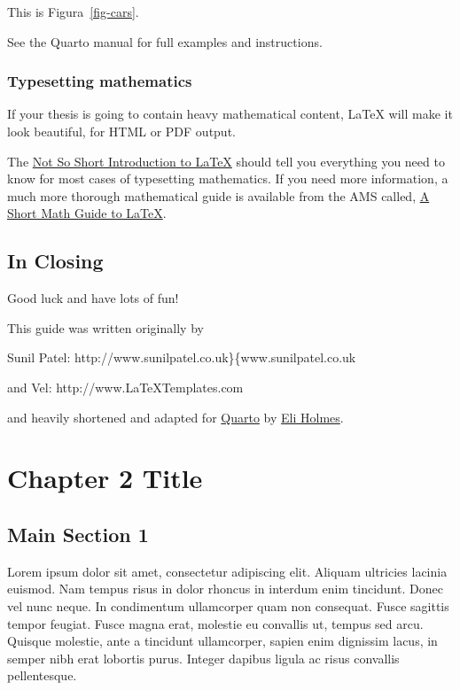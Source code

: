 \documentclass[
  letterpaper,
  11pt,
  spanish,
  singlespacing,
  headsepline]{MastersDoctoralThesis}
\begin{document}
This is Figura~\ref{fig-cars}.

See the Quarto manual for full examples and instructions.

\hypertarget{typesetting-mathematics}{%
\subsection{Typesetting mathematics}\label{typesetting-mathematics}}

If your thesis is going to contain heavy mathematical content, \LaTeX{}
will make it look beautiful, for HTML or PDF output.

The
\href{http://www.ctan.org/tex-archive/info/lshort/english/lshort.pdf}{Not
So Short Introduction to LaTeX} should tell you everything you need to
know for most cases of typesetting mathematics. If you need more
information, a much more thorough mathematical guide is available from
the AMS called,
\href{http://tug.ctan.org/info/short-math-guide/short-math-guide.pdf}{A
Short Math Guide to LaTeX}.

\hypertarget{in-closing}{%
\section{In Closing}\label{in-closing}}

Good luck and have lots of fun!

This guide was written originally by

Sunil Patel: http://www.sunilpatel.co.uk\}\{www.sunilpatel.co.uk

and Vel: http://www.LaTeXTemplates.com

and heavily shortened and adapted for \href{https://quarto.org/}{Quarto}
by \href{https://eeholmes.github.io}{Eli Holmes}.


\hypertarget{sec-Chapter2}{%
\chapter{Chapter 2 Title}\label{sec-Chapter2}}

\hypertarget{main-section-1}{%
\section{Main Section 1}\label{main-section-1}}

Lorem ipsum dolor sit amet, consectetur adipiscing elit. Aliquam
ultricies lacinia euismod. Nam tempus risus in dolor rhoncus in interdum
enim tincidunt. Donec vel nunc neque. In condimentum ullamcorper quam
non consequat. Fusce sagittis tempor feugiat. Fusce magna erat, molestie
eu convallis ut, tempus sed arcu. Quisque molestie, ante a tincidunt
ullamcorper, sapien enim dignissim lacus, in semper nibh erat lobortis
purus. Integer dapibus ligula ac risus convallis pellentesque.
\end{document}

